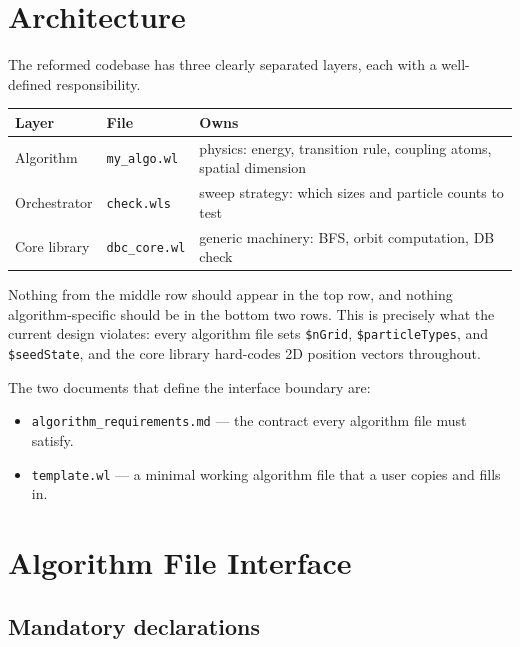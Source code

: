 \documentclass[12pt,a4paper]{article}
\begin{document}
\section{Architecture}
\label{sec:architecture}

The reformed codebase has three clearly separated layers, each with a
well-defined responsibility.

\begin{center}
\begin{tabular}{llp{7cm}}
\toprule
Layer & File & Owns \\
\midrule
Algorithm & \texttt{my\_algo.wl} & physics: energy, transition rule, coupling atoms, spatial dimension \\
Orchestrator & \texttt{check.wls} & sweep strategy: which sizes and particle counts to test \\
Core library & \texttt{dbc\_core.wl} & generic machinery: BFS, orbit computation, DB check \\
\bottomrule
\end{tabular}
\end{center}

\medskip
Nothing from the middle row should appear in the top row, and nothing
algorithm-specific should be in the bottom two rows.  This is precisely what
the current design violates: every algorithm file sets \texttt{\$nGrid},
\texttt{\$particleTypes}, and \texttt{\$seedState}, and the core library
hard-codes 2D position vectors throughout.

The two documents that define the interface boundary are:
\begin{itemize}
  \item \texttt{algorithm\_requirements.md} --- the contract every algorithm
    file must satisfy.
  \item \texttt{template.wl} --- a minimal working algorithm file that a user
    copies and fills in.
\end{itemize}

\section{Algorithm File Interface}
\label{sec:interface}

\subsection{Mandatory declarations}
\end{document}
